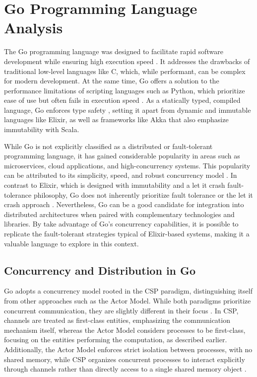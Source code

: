 \section{Go Programming Language Analysis}

The Go programming language was designed to facilitate rapid software development while ensuring high execution speed \cite{Kennedy2016, Cox-Buday2017}. It addresses the drawbacks of traditional low-level languages like C, which, while performant, can be complex for modern development. At the same time, Go offers a solution to the performance limitations of scripting languages such as Python, which prioritize ease of use but often fails in execution speed \cite{Kennedy2016}. As a statically typed, compiled language, Go enforces type safety \cite{go-docs}, setting it apart from dynamic and immutable languages like Elixir, as well as frameworks like Akka that also emphasize immutability with Scala.

While Go is not explicitly classified as a distributed or fault-tolerant programming language, it has gained considerable popularity in areas such as microservices, cloud applications, and high-concurrency systems. This popularity can be attributed to its simplicity, speed, and robust concurrency model \cite{Castro2019,Shuiskov2022}. In contrast to Elixir, which is designed with immutability and a let it crash fault-tolerance philosophy, Go does not inherently prioritize fault tolerance or the let it crash approach \cite{Cox-Buday2017}. Nevertheless, Go can be a good candidate for integration into distributed architectures when paired with complementary technologies and libraries. By take advantage of Go’s concurrency capabilities, it is possible to replicate the fault-tolerant strategies typical of Elixir-based systems, making it a valuable language to explore in this context.

\subsection{Concurrency and Distribution in Go}

Go adopts a concurrency model rooted in the \gls{CSP} paradigm, distinguishing itself from other approaches such as the Actor Model. While both paradigms prioritize concurrent communication, they are slightly different in their focus \cite{Cox-Buday2017}. In \gls{CSP}, channels are treated as first-class entities, emphasizing the communication mechanism itself, whereas the Actor Model considers processes to be first-class, focusing on the entities performing the computation, as described earlier. Additionally, the Actor Model enforces strict isolation between processes, with no shared memory, while CSP organizes concurrent processes to interact explicitly through channels rather than directly access to a single shared memory object \cite{Cox-Buday2017}.


